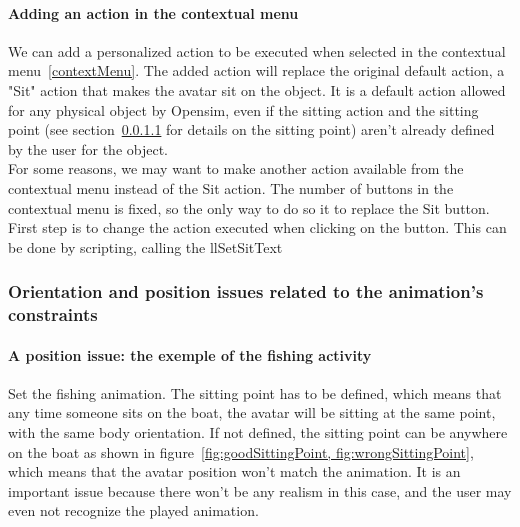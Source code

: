 \paragraph{Adding an action in the contextual menu}
\label{sec:menuAction}
We can add a personalized action to be executed when selected in the contextual menu~\ref{contextMenu}. The added action will replace the original default action, a "Sit" action that makes the avatar sit on the object. It is a default action allowed for any physical object by Opensim, even if the sitting action and the sitting point (see section~\ref{sittingpoint} for details on the sitting point) aren't already defined by the user for the object. 
\\For some reasons, we may want to make another action available from the contextual menu instead of the Sit action. The number of buttons in the contextual menu is fixed, so the only way to do so it to replace the Sit button. First step is to change the action executed when clicking on the button. This can be done by scripting, calling the 
llSetSitText

\subsubsection{Orientation and position issues related to the animation's constraints}

\paragraph{A position issue: the exemple of the fishing activity}
\label{sittingpoint}

Set the fishing animation.
The sitting point has to be defined, which means that any time someone sits on the boat, the avatar will be sitting at the same point, with the same body orientation. If not defined, the sitting point can be anywhere on the boat as shown in figure~\ref{fig:goodSittingPoint, fig:wrongSittingPoint}, which means that the avatar position won't match the animation. It is an important issue because there won't be any realism in this case, and the user may even not recognize the played animation.

